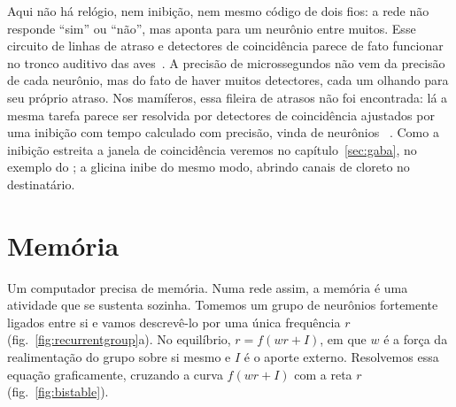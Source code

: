 Aqui não há relógio, nem inibição, nem mesmo código de dois fios: a rede não responde ``sim'' ou ``não'', mas aponta para um neurônio entre muitos. Esse circuito de linhas de atraso e detectores de coincidência parece de fato funcionar no tronco auditivo das aves~\cite{Carr1990}. A precisão de microssegundos não vem da precisão de cada neurônio, mas do fato de haver muitos detectores, cada um olhando para seu próprio atraso. Nos mamíferos, essa fileira de atrasos não foi encontrada: lá a mesma tarefa parece ser resolvida por detectores de coincidência ajustados por uma inibição com tempo calculado com precisão, vinda de neurônios ~\cite{Brand2002,Grothe2010}. Como a inibição estreita a janela de coincidência veremos no capítulo~\ref{sec:gaba}, no exemplo do ; a glicina inibe do mesmo modo, abrindo canais de cloreto no destinatário.

\section{Memória}

Um computador precisa de memória. Numa rede assim, a memória é uma atividade que se sustenta sozinha. Tomemos um grupo de neurônios  fortemente ligados entre si e vamos descrevê-lo por uma única frequência $r$ (fig.~\ref{fig:recurrentgroup}a). No equilíbrio, $r=f(wr+I)$, em que $w$ é a força da realimentação do grupo sobre si mesmo e $I$ é o aporte externo. Resolvemos essa equação graficamente, cruzando a curva $f(wr+I)$ com a reta $r$ (fig.~\ref{fig:bistable}).

